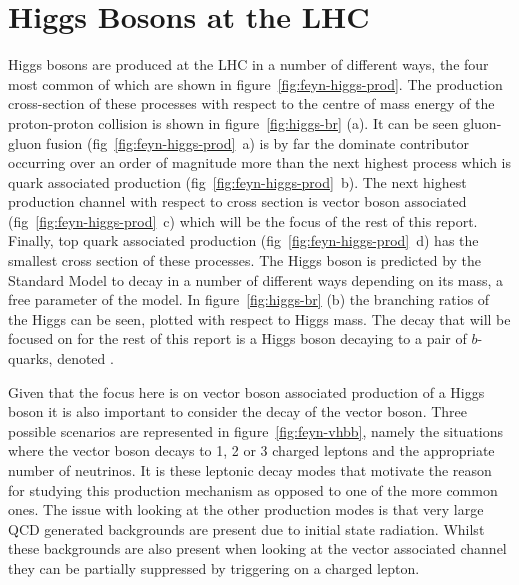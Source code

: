 \section{Higgs Bosons at the LHC}
%
Higgs bosons are produced at the LHC in a number of different ways, the four
most common of which are shown in figure~\ref{fig:feyn-higgs-prod}.
 The production cross-section of these
processes with respect to the centre of mass energy of the proton-proton
collision is shown in figure~\ref{fig:higgs-br} (a). It can be seen gluon-gluon
fusion (fig~\ref{fig:feyn-higgs-prod}~a) is by far the dominate contributor
occurring over an order of magnitude more than the next highest process which is
quark associated production (fig~\ref{fig:feyn-higgs-prod}~b). The next highest
production channel with respect to cross section is vector boson associated
(fig~\ref{fig:feyn-higgs-prod}~c) which will be the focus of the rest of this
report. Finally, top quark associated production
(fig~\ref{fig:feyn-higgs-prod}~d) has the smallest cross section of these
processes. The Higgs boson is predicted by the Standard Model to decay in a
number of different ways depending on its mass, a free parameter of the model.
In figure~\ref{fig:higgs-br} (b) the branching ratios of the Higgs can be seen,
plotted with respect to Higgs mass. The decay that will be focused on for the
rest of this report is a Higgs boson decaying to a pair of $b$-quarks, denoted
\Hbb.

Given that the focus here is on vector boson associated production
of a Higgs boson it is also important to consider the decay of the vector boson.
Three possible scenarios are represented in figure~\ref{fig:feyn-vhbb}, namely
the situations where the vector boson decays to 1, 2 or 3 charged leptons and
the appropriate number of neutrinos.  It is
these leptonic decay modes that motivate the reason for studying this production
mechanism as opposed to one of the more common ones. The issue with looking at
the other production modes is that very large QCD generated backgrounds are
present due to initial state radiation. Whilst these backgrounds are also
present when looking at the vector associated channel they can be partially
suppressed by triggering on a charged lepton.

